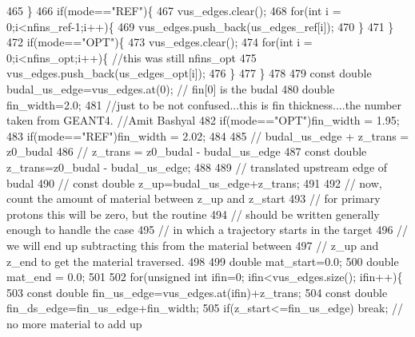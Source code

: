 \begin{DoxyCode}
465     \}
466     \textcolor{keywordflow}{if}(mode==\textcolor{stringliteral}{"REF"})\{
467       vus\_edges.clear();
468       \textcolor{keywordflow}{for}(\textcolor{keywordtype}{int} i = 0;i<nfins\_ref-1;i++)\{
469         vus\_edges.push\_back(us\_edges\_ref[i]);
470       \}
471     \}
472     \textcolor{keywordflow}{if}(mode==\textcolor{stringliteral}{"OPT"})\{
473       vus\_edges.clear();
474       \textcolor{keywordflow}{for}(\textcolor{keywordtype}{int} i = 0;i<nfins\_opt;i++)\{ \textcolor{comment}{//this was still nfins\_opt}
475         vus\_edges.push\_back(us\_edges\_opt[i]);
476       \}      
477     \}
478     
479     \textcolor{keyword}{const} \textcolor{keywordtype}{double} budal\_us\_edge=vus\_edges.at(0); \textcolor{comment}{// fin[0] is the budal}
480     \textcolor{keywordtype}{double} fin\_width=2.0;
481     \textcolor{comment}{//just to be not confused...this is fin thickness....the number taken from GEANT4. //Amit Bashyal}
482     \textcolor{keywordflow}{if}(mode==\textcolor{stringliteral}{"OPT"})fin\_width = 1.95;
483     \textcolor{keywordflow}{if}(mode==\textcolor{stringliteral}{"REF"})fin\_width = 2.02;
484  
485     \textcolor{comment}{// budal\_us\_edge + z\_trans = z0\_budal}
486     \textcolor{comment}{// z\_trans = z0\_budal - budal\_us\_edge}
487     \textcolor{keyword}{const} \textcolor{keywordtype}{double} z\_trans=z0\_budal - budal\_us\_edge;
488     
489     \textcolor{comment}{// translated upstream edge of budal}
490     \textcolor{comment}{//    const double z\_up=budal\_us\_edge+z\_trans;}
491     
492     \textcolor{comment}{// now, count the amount of material between z\_up and z\_start}
493     \textcolor{comment}{// for primary protons this will be zero, but the routine}
494     \textcolor{comment}{// should be written generally enough to handle the case}
495     \textcolor{comment}{// in which a trajectory starts in the target}
496     \textcolor{comment}{// we will end up subtracting this from the material between}
497     \textcolor{comment}{// z\_up and z\_end to get the material traversed.}
498 
499     \textcolor{keywordtype}{double} mat\_start=0.0;
500     \textcolor{keywordtype}{double} mat\_end = 0.0;
501 
502     \textcolor{keywordflow}{for}(\textcolor{keywordtype}{unsigned} \textcolor{keywordtype}{int} ifin=0; ifin<vus\_edges.size(); ifin++)\{
503       \textcolor{keyword}{const} \textcolor{keywordtype}{double} fin\_us\_edge=vus\_edges.at(ifin)+z\_trans;
504       \textcolor{keyword}{const} \textcolor{keywordtype}{double} fin\_ds\_edge=fin\_us\_edge+fin\_width;
505       \textcolor{keywordflow}{if}(z\_start<=fin\_us\_edge) \textcolor{keywordflow}{break}; \textcolor{comment}{// no more material to add up}

\end{DoxyCode}
